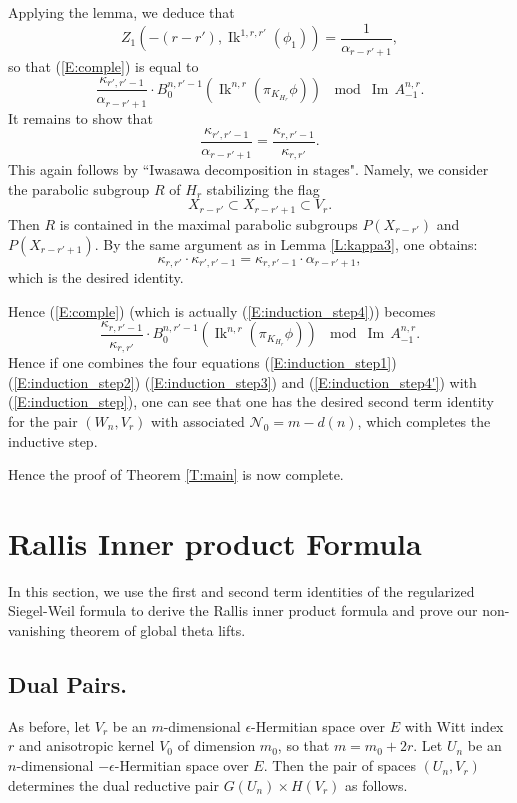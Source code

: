 \documentclass[10pt]{amsart}
\theoremstyle{plain}
\numberwithin{equation}{section}
\begin{document}
 Applying the lemma, we deduce that 
  \[   Z_1(-(r-r'), {\operatorname{Ik}}^{1,r,r'}(\phi_1))  =
  \frac{1}{\alpha_{r-r'+1}},\]
  so that (\ref{E:comple}) is equal to
\[   \frac{\kappa_{r',r'-1}}{\alpha_{r-r'+1} } \cdot  B^{n,
  r'-1}_0({\operatorname{Ik}}^{n,r}(\pi_{K_{H_r}}\phi))  \, \mod {{\operatorname{Im\,}} A^{n,r}_{-1}}.
\]
 It remains to show that
 \[  \frac{\kappa_{r', r'-1}}{\alpha_{r-r'+1} }
=  \frac{\kappa_{r,r'-1}}{\kappa_{r,r'}}. 
\]
This again follows by ``Iwasawa decomposition in stages". Namely, we
consider the parabolic subgroup $R$ of $H_r$ stabilizing the flag
\[  X_{r-r'} \subset X_{r-r' +1} \subset V_r. \]
Then $R$ is contained in the maximal parabolic subgroups $P(X_{r-r'})$ and $P(X_{r-r'+1})$.
 By the same argument as in Lemma \ref{L:kappa3}, one obtains:
 \[  \kappa_{r,r'} \cdot \kappa_{r', r'-1} =  \kappa_{r, r'-1} \cdot \alpha_{r-r'+1},\]
 which is the desired identity.

Hence (\ref{E:comple}) (which is actually  (\ref{E:induction_step4}))
becomes
\begin{equation}\label{E:induction_step4'}
  \frac{\kappa_{r,r'-1}}{\kappa_{r,r'}} \cdot  B^{n,
  r'-1}_0({\operatorname{Ik}}^{n,r}(\pi_{K_{H_r}}\phi))  \, \mod {{\operatorname{Im\,}} A^{n,r}_{-1}}.
\end{equation}
Hence if one combines the four equations (\ref{E:induction_step1})
(\ref{E:induction_step2}) (\ref{E:induction_step3}) and
(\ref{E:induction_step4'}) with (\ref{E:induction_step}), one can
see that one has the desired second term identity for the pair
$(W_n, V_r)$ with associated $\mathcal{N}_0 = m - d(n)$, which
completes the inductive step.
 \vskip 5pt
 
 
Hence the proof of Theorem \ref{T:main} is now complete.
 \vskip 15pt
 
 
 \section{\bf Rallis Inner product Formula}
 
 In this section, we use the first and second term identities of the
 regularized Siegel-Weil formula to derive the Rallis inner product
 formula and prove our non-vanishing theorem of global theta lifts.
 \vskip 5pt
 
 \subsection{\bf Dual Pairs.}
 As before, let $V_r$ be an $m$-dimensional $\epsilon$-Hermitian space
 over $E$ with Witt index $r$ and anisotropic kernel $V_0$ of
 dimension $m_0$, so that $m = m_0+2r$.   
 Let $U_n$ be an $n$-dimensional $-\epsilon$-Hermitian space over
 $E$. Then the pair of spaces $(U_n, V_r)$ determines the dual reductive
 pair $G(U_n)\times H(V_r)$ as follows.
 \vskip 5pt
\end{document}
